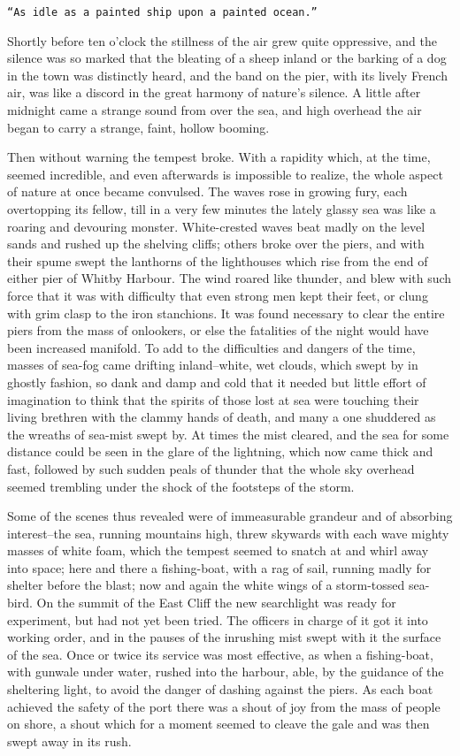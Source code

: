 \documentclass[12pt,openright]{book}
\begin{document}
\texttt{“As idle as a painted ship upon a painted ocean.”}

Shortly before ten o’clock the stillness of the air grew quite oppressive, and the silence was so marked that the bleating of a sheep inland or the barking of a dog in the town was distinctly heard, and the band on the pier, with its lively French air, was like a discord in the great harmony of nature’s silence. A little after midnight came a strange sound from over the sea, and high overhead the air began to carry a strange, faint, hollow booming.

Then without warning the tempest broke. With a rapidity which, at the time, seemed incredible, and even afterwards is impossible to realize, the whole aspect of nature at once became convulsed. The waves rose in growing fury, each overtopping its fellow, till in a very few minutes the lately glassy sea was like a roaring and devouring monster. White-crested waves beat madly on the level sands and rushed up the shelving cliffs; others broke over the piers, and with their spume swept the lanthorns of the lighthouses which rise from the end of either pier of Whitby Harbour. The wind roared like thunder, and blew with such force that it was with difficulty that even strong men kept their feet, or clung with grim clasp to the iron stanchions. It was found necessary to clear the entire piers from the mass of onlookers, or else the fatalities of the night would have been increased manifold. To add to the difficulties and dangers of the time, masses of sea-fog came drifting inland–white, wet clouds, which swept by in ghostly fashion, so dank and damp and cold that it needed but little effort of imagination to think that the spirits of those lost at sea were touching their living brethren with the clammy hands of death, and many a one shuddered as the wreaths of sea-mist swept by. At times the mist cleared, and the sea for some distance could be seen in the glare of the lightning, which now came thick and fast, followed by such sudden peals of thunder that the whole sky overhead seemed trembling under the shock of the footsteps of the storm.

Some of the scenes thus revealed were of immeasurable grandeur and of absorbing interest–the sea, running mountains high, threw skywards with each wave mighty masses of white foam, which the tempest seemed to snatch at and whirl away into space; here and there a fishing-boat, with a rag of sail, running madly for shelter before the blast; now and again the white wings of a storm-tossed sea-bird. On the summit of the East Cliff the new searchlight was ready for experiment, but had not yet been tried. The officers in charge of it got it into working order, and in the pauses of the inrushing mist swept with it the surface of the sea. Once or twice its service was most effective, as when a fishing-boat, with gunwale under water, rushed into the harbour, able, by the guidance of the sheltering light, to avoid the danger of dashing against the piers. As each boat achieved the safety of the port there was a shout of joy from the mass of people on shore, a shout which for a moment seemed to cleave the gale and was then swept away in its rush.
\end{document}
